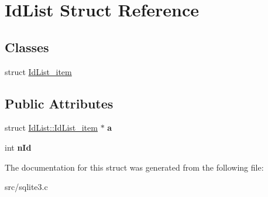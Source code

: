 \hypertarget{struct_id_list}{\section{Id\-List Struct Reference}
\label{struct_id_list}
}
\subsection*{Classes}
\begin{DoxyCompactItemize}
\item 
struct \hyperlink{struct_id_list_1_1_id_list__item}{Id\-List\-\_\-item}
\end{DoxyCompactItemize}
\subsection*{Public Attributes}
\begin{DoxyCompactItemize}
\item 
\hypertarget{struct_id_list_ad33082fd71286c1159711a1a3e979763}{struct \hyperlink{struct_id_list_1_1_id_list__item}{Id\-List\-::\-Id\-List\-\_\-item} $\ast$ {\bfseries a}}\label{struct_id_list_ad33082fd71286c1159711a1a3e979763}

\item 
\hypertarget{struct_id_list_afb785717796d8b3c72d1ae682dcb6ff0}{int {\bfseries n\-Id}}\label{struct_id_list_afb785717796d8b3c72d1ae682dcb6ff0}

\end{DoxyCompactItemize}


The documentation for this struct was generated from the following file\-:\begin{DoxyCompactItemize}
\item 
src/sqlite3.\-c\end{DoxyCompactItemize}
